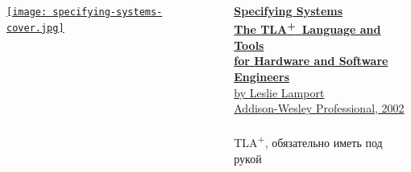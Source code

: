 \documentclass[
  11pt,aspectratio=169,pdf,hyperref={unicode,colorlinks=false}
]{beamer}
\def\TLA{TLA\textsuperscript{+}}
\begin{document}
\begin{frame}[c]
  \begin{columns}
    \begin{column}{.47\textwidth}
      \begin{minipage}[c][0.75\textheight][c]{\columnwidth}
      \centering%
      \href{https://lamport.azurewebsites.net/tla/book.html\#download}{%
        \texttt{[image: specifying-systems-cover.jpg]}
      }%
      \end{minipage}%
    \end{column}
    \begin{column}{.47\textwidth}
      \begin{minipage}[c][0.75\textheight][s]{\columnwidth}
      \href{https://lamport.azurewebsites.net/tla/book.html\#download}{%
        {\Large\bf Specifying Systems}\\%
        {\large\bf The \TLA\ Language and Tools\\%
        for Hardware and Software\\%
        Engineers}\\%
        {\normalsize by Leslie Lamport\\Addison-Wesley Professional, 2002}%
      }%
      \\%
      \\%
      {\large \TLA, обязательно иметь под рукой}%
      \vfill%
      \href{https://lamport.azurewebsites.net/tla/book.html\#download}{%
      }%
      \end{minipage}%
    \end{column}
  \end{columns}
\end{frame}
\end{document}
